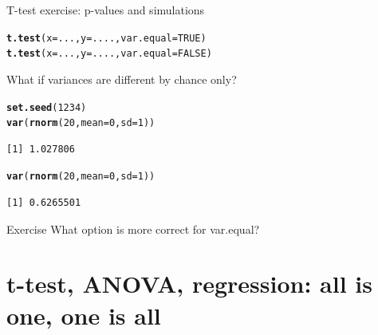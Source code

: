 \documentclass[10pt]{beamer}\usepackage[]{graphicx}\usepackage[]{color}
\makeatletter
\newcommand{\hlnum}[1]{\textcolor[rgb]{0.686,0.059,0.569}{#1}}%
\newcommand{\hlstd}[1]{\textcolor[rgb]{0.345,0.345,0.345}{#1}}%
\newcommand{\hlkwc}[1]{\textcolor[rgb]{0.333,0.667,0.333}{#1}}%
\newcommand{\hlkwd}[1]{\textcolor[rgb]{0.737,0.353,0.396}{\textbf{#1}}}%
\newenvironment{kframe}{%
 \def\at@end@of@kframe{}%
 \ifinner\ifhmode%
  \def\at@end@of@kframe{\end{minipage}}%
  \begin{minipage}{\columnwidth}%
 \fi\fi%
 \def\FrameCommand##1{\hskip\@totalleftmargin \hskip-\fboxsep
 \colorbox{shadecolor}{##1}\hskip-\fboxsep
     \hskip-\linewidth \hskip-\@totalleftmargin \hskip\columnwidth}%
 \MakeFramed {\advance\hsize-\width
   \@totalleftmargin\z@ \linewidth\hsize
   \@setminipage}}%
 {\par\unskip\endMakeFramed%
 \at@end@of@kframe}
\newenvironment{knitrout}{}{} %
\makeatother
\begin{document}
\begin{frame}[fragile]{T-test exercise: p-values and simulations}

\begin{knitrout}
\color{fgcolor}\begin{kframe}
\begin{alltt}
\hlkwd{t.test}\hlstd{(}\hlkwc{x} \hlstd{= ...,} \hlkwc{y}\hlstd{=....,} \hlkwc{var.equal} \hlstd{=} \hlnum{TRUE}\hlstd{)}
\hlkwd{t.test}\hlstd{(}\hlkwc{x} \hlstd{= ...,} \hlkwc{y}\hlstd{=....,} \hlkwc{var.equal} \hlstd{=} \hlnum{FALSE}\hlstd{)}
\end{alltt}
\end{kframe}
\end{knitrout}

What if variances are different by chance only?
\begin{knitrout}
\color{fgcolor}\begin{kframe}
\begin{alltt}
\hlkwd{set.seed}\hlstd{(}\hlnum{1234}\hlstd{)}
\hlkwd{var}\hlstd{(}\hlkwd{rnorm}\hlstd{(}\hlnum{20}\hlstd{,} \hlkwc{mean} \hlstd{=} \hlnum{0}\hlstd{,} \hlkwc{sd} \hlstd{=} \hlnum{1}\hlstd{))}
\end{alltt}
\begin{verbatim}
[1] 1.027806
\end{verbatim}
\begin{alltt}
\hlkwd{var}\hlstd{(}\hlkwd{rnorm}\hlstd{(}\hlnum{20}\hlstd{,} \hlkwc{mean} \hlstd{=} \hlnum{0}\hlstd{,} \hlkwc{sd} \hlstd{=} \hlnum{1}\hlstd{))}
\end{alltt}
\begin{verbatim}
[1] 0.6265501
\end{verbatim}
\end{kframe}
\end{knitrout}

\begin{alertblock}{Exercise}
  What option is more correct for var.equal?
\end{alertblock}

\end{frame}
\section{t-test, ANOVA, regression: all is one, one is all}
\end{document}
